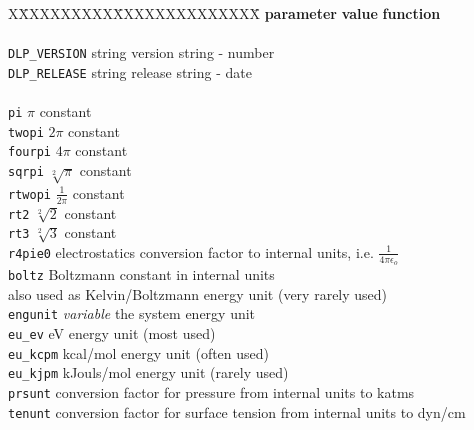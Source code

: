 \begin{tabbing}
X\=XXXXXXXXX\=XXXXXXXXXXXXXX\=\kill
\> {\bf parameter}   \> {\bf value}          \> {\bf function} \\
\>                   \>                      \> \\
\> {\tt DLP\_VERSION}\> string               \> version string - number \\
\> {\tt DLP\_RELEASE}\> string               \> release string - date \\
\>                   \>                      \> \\
\> {\tt pi}            \> $\pi$ constant \\
\> {\tt twopi}         \> $2 \pi$ constant \\
\> {\tt fourpi}       \> $4 \pi$ constant \\
\> {\tt sqrpi}           \> $\sqrt[2]{\pi}$ constant \\
\> {\tt rtwopi}        \> $\frac{1}{2 \pi}$ constant \\
\> {\tt rt2}           \> $\sqrt[2]{2}$ constant \\
\> {\tt rt3}           \> $\sqrt[2]{3}$ constant \\
\> {\tt r4pie0}                \> electrostatics conversion factor to internal units, i.e. $\frac{1}{4 \pi \epsilon_{o}}$ \\
\> {\tt boltz}                 \> Boltzmann constant in internal units \\
\>                   \>                      \> also used as Kelvin/Boltzmann energy unit (very rarely used) \\
\> {\tt engunit}     \> {\em variable}       \> the system energy unit \\
\> {\tt eu\_ev}                \> eV energy unit (most used) \\
\> {\tt eu\_kcpm}                    \> kcal/mol energy unit (often used) \\
\> {\tt eu\_kjpm}                    \> kJouls/mol energy unit (rarely used) \\
\> {\tt prsunt}                \> conversion factor for pressure from internal units to katms \\
\> {\tt tenunt}                \> conversion factor for surface tension from internal units to dyn/cm \\

\end{tabbing}
